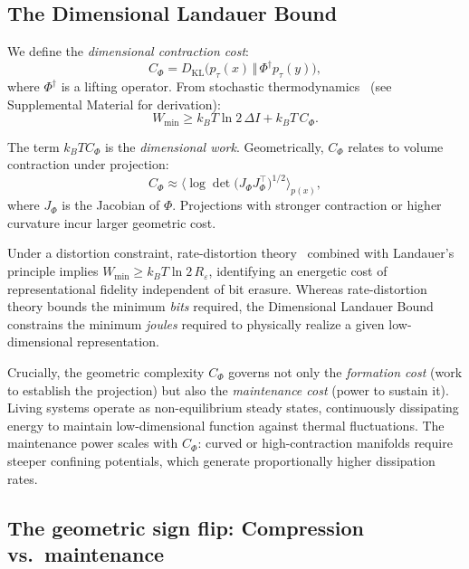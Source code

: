 \documentclass[aps,prx,twocolumn,superscriptaddress,floatfix]{revtex4-2}
\begin{document}
\subsection{The Dimensional Landauer Bound}

We define the \emph{dimensional contraction cost}:
\begin{equation}
C_\Phi = D_{\mathrm{KL}}\big(p_\tau(x)\,\Vert\,\Phi^\dagger p_\tau(y)\big),
\end{equation}
where $\Phi^\dagger$ is a lifting operator. From stochastic thermodynamics~\cite{seifert2012,chen2021} (see Supplemental Material for derivation):
\begin{equation}
\boxed{W_{\min} \ge k_B T \ln 2\, \Delta I + k_B T\, C_\Phi.}
\label{eq:main}
\end{equation}

The term $k_B T C_\Phi$ is the \emph{dimensional work}. Geometrically, $C_\Phi$ relates to volume contraction under projection:
\begin{equation}
C_\Phi \approx \Big\langle \log \det\big(J_\Phi J_\Phi^\top\big)^{1/2} \Big\rangle_{p(x)},
\end{equation}
where $J_\Phi$ is the Jacobian of $\Phi$. Projections with stronger contraction or higher curvature incur larger geometric cost.

Under a distortion constraint, rate-distortion theory~\cite{cover2006} combined with Landauer's principle implies $W_{\min} \ge k_B T \ln 2\, R_\varepsilon$, identifying an energetic cost of representational fidelity independent of bit erasure. Whereas rate-distortion theory bounds the minimum \emph{bits} required, the Dimensional Landauer Bound constrains the minimum \emph{joules} required to physically realize a given low-dimensional representation.

Crucially, the geometric complexity $C_\Phi$ governs not only the \emph{formation cost} (work to establish the projection) but also the \emph{maintenance cost} (power to sustain it). Living systems operate as non-equilibrium steady states, continuously dissipating energy to maintain low-dimensional function against thermal fluctuations. The maintenance power scales with $C_\Phi$: curved or high-contraction manifolds require steeper confining potentials, which generate proportionally higher dissipation rates.

\subsection{The geometric sign flip: Compression vs.\ maintenance}
\end{document}
